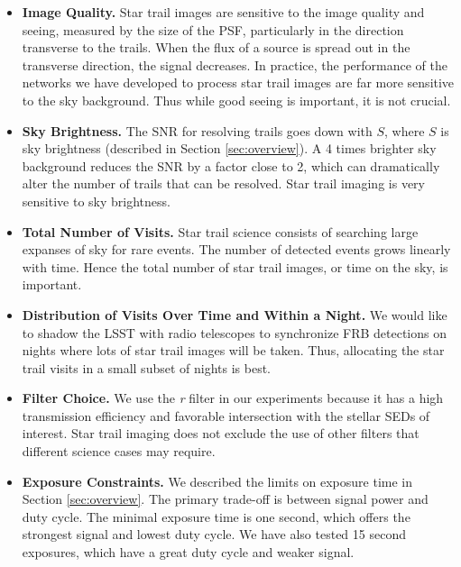 \documentclass[12pt, letterpaper]{article}
\begin{document}
\begin{itemize}
\item \textbf{Image Quality.} Star trail images are sensitive to the image quality and seeing, measured by the size of the PSF, particularly in the direction transverse to the trails. When the flux of a source is spread out in the transverse direction, the signal decreases. In practice, the performance of the networks we have developed to process star trail images are far more sensitive to the sky background. Thus while good seeing is important, it is not crucial.

\item \textbf{Sky Brightness.} The SNR for resolving trails goes down with $S$, where $S$ is sky brightness (described in Section \ref{sec:overview}). A 4 times brighter sky background reduces the SNR by a factor close to 2, which can dramatically alter the number of trails that can be resolved. Star trail imaging is very sensitive to sky brightness. 

\item \textbf{Total Number of Visits.} Star trail science consists of searching large expanses of sky for rare events. The number of detected events grows linearly with time. Hence the total number of star trail images, or time on the sky, is important.

\item \textbf{Distribution of Visits Over Time and Within a Night.} We would like to shadow the LSST with radio telescopes to synchronize FRB detections on nights where lots of star trail images will be taken. Thus, allocating the star trail visits in a small subset of nights is best. 

\item \textbf{Filter Choice.} We use the \textit{r} filter in our experiments because it has a high transmission efficiency and favorable intersection with the stellar SEDs of interest. Star trail imaging does not exclude the use of other filters that different science cases may require.

\item \textbf{Exposure Constraints.} We described the limits on exposure time in Section \ref{sec:overview}. The primary trade-off is between signal power and duty cycle. The minimal exposure time is one second, which offers the strongest signal and lowest duty cycle. We have also tested 15 second exposures, which have a great duty cycle and weaker signal. 
\end{itemize}
\end{document}
